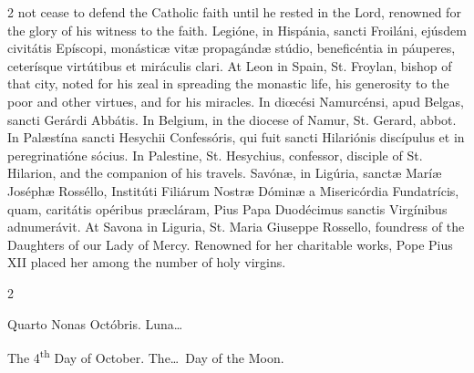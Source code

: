\begin{paracol}{2}
 not cease to defend the Catholic faith until he rested in the Lord, renowned 
 for the glory of his witness to the faith.
\switchcolumn*
{}
Legióne, in Hispánia, 
 sancti Froiláni, ejúsdem civitátis Epíscopi, monásticæ vitæ propagándæ 
 stúdio, beneficéntia in páuperes, ceterísque virtútibus et miráculis clari.
\switchcolumn
{}
At Leon in Spain, St. Froylan, 
 bishop of that city, noted for his zeal in spreading the monastic life, his 
 generosity to the poor and other virtues, and for his miracles.
\switchcolumn*
{}
In diœcési Namurcénsi, 
 apud Belgas, sancti Gerárdi Abbátis.
\switchcolumn
{}
In Belgium, in the diocese of Namur, 
 St. Gerard, abbot.
\switchcolumn*
{}
In Palæstína sancti 
 Hesychii Confessóris, qui fuit sancti Hilariónis discípulus et in 
 peregrinatióne sócius.
\switchcolumn
{}
In Palestine, St. Hesychius, 
 confessor, disciple of St. Hilarion, and the companion of his travels.
\switchcolumn*
{}
Savónæ, in Ligúria, 
 sanctæ Maríæ Joséphæ Rosséllo, Institúti Filiárum Nostræ Dóminæ a 
 Misericórdia Fundatrícis, quam, caritátis opéribus præcláram, Pius Papa 
 Duodécimus sanctis Virgínibus adnumerávit.
\switchcolumn
{}
At Savona in Liguria, St. Maria 
 Giuseppe Rossello, foundress of the Daughters of our Lady of Mercy. 
 Renowned for her charitable works, Pope Pius XII placed her among the number 
 of holy virgins.
\switchcolumn*
{}
\end{paracol}


\begin{paracol}{2}
\begin{center}{\color{gregoriocolor} Quarto Nonas Octóbris. 
 Luna\dots\ }\end{center}
\switchcolumn
{}
\begin{center}{\color{gregoriocolor} The   4\textsuperscript{th} Day of 
 October. The\dots\ Day of the Moon.}\end{center}
\end{paracol}


